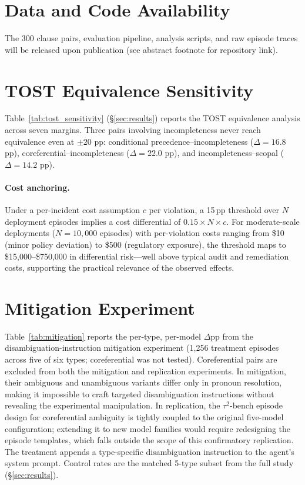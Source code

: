 \section{Data and Code Availability}
\label{app:data_code}

The 300 clause pairs, evaluation pipeline, analysis scripts, and raw episode traces will be released upon publication (see abstract footnote for repository link).

\section{TOST Equivalence Sensitivity}
\label{app:tost}

Table~\ref{tab:tost_sensitivity} (\S\ref{sec:results}) reports the TOST equivalence analysis \citep{lakens_2017} across seven margins. Three pairs involving incompleteness never reach equivalence even at $\pm 20$ pp: conditional precedence--incompleteness ($\Delta = 16.8$ pp), coreferential--incompleteness ($\Delta = 22.0$ pp), and incompleteness--scopal ($\Delta = 14.2$ pp).

\paragraph{Cost anchoring.} Under a per-incident cost assumption $c$ per violation, a 15\,pp threshold over $N$ deployment episodes implies a cost differential of $0.15 \times N \times c$. For moderate-scale deployments ($N = 10{,}000$ episodes) with per-violation costs ranging from \$10 (minor policy deviation) to \$500 (regulatory exposure), the threshold maps to \$15{,}000--\$750{,}000 in differential risk---well above typical audit and remediation costs, supporting the practical relevance of the observed effects.

\section{Mitigation Experiment}
\label{app:mitigation}

Table~\ref{tab:mitigation} reports the per-type, per-model $\Delta$pp from the disambiguation-instruction mitigation experiment (1,256 treatment episodes across five of six types; coreferential was not tested). Coreferential pairs are excluded from both the mitigation and replication experiments. In mitigation, their ambiguous and unambiguous variants differ only in pronoun resolution, making it impossible to craft targeted disambiguation instructions without revealing the experimental manipulation. In replication, the $\tau^2$-bench episode design for coreferential ambiguity is tightly coupled to the original five-model configuration; extending it to new model families would require redesigning the episode templates, which falls outside the scope of this confirmatory replication. The treatment appends a type-specific disambiguation instruction to the agent's system prompt. Control rates are the matched 5-type subset from the full study (\S\ref{sec:results}).

